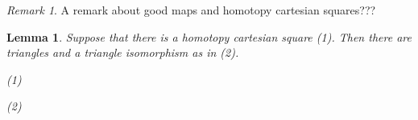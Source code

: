 \documentclass[11pt]{article}
\newtheorem{lemma}[theorem]{Lemma}
\theoremstyle{definition}
\theoremstyle{remark}
\newtheorem*{remark}{Remark}
\begin{document}
            \begin{remark}
                A remark about good maps and homotopy cartesian squares???
            \end{remark}

            \begin{lemma}
                Suppose that there is a homotopy cartesian square (1). Then there are triangles and a triangle isomorphism as in (2).
                \begin{center}
                    (1)
                    (2)
                \end{center}
            \end{lemma}
\end{document}
